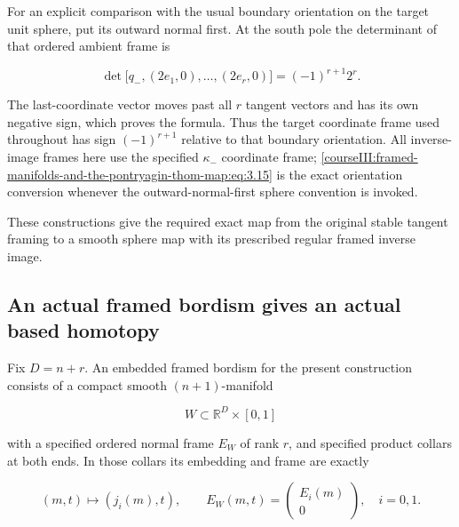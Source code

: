 For an explicit comparison with the usual boundary orientation on the target unit sphere, put its outward normal first. At the south pole the determinant of that ordered ambient frame is

\begin{equation}
\det\bigl[q_-,(2e_1,0),\ldots,(2e_r,0)\bigr]
                       =(-1)^{r+1}2^r.
 \label{courseIII:framed-manifolds-and-the-pontryagin-thom-map:eq:3.15}
\end{equation}

The last-coordinate vector moves past all \(r\) tangent vectors and has its own negative sign, which proves the formula. Thus the target coordinate frame used throughout has sign \((-1)^{r+1}\) relative to that boundary orientation. All inverse-image frames here use the specified \(\kappa_-\) coordinate frame; \eqref{courseIII:framed-manifolds-and-the-pontryagin-thom-map:eq:3.15} is the exact orientation conversion whenever the outward-normal-first sphere convention is invoked.

These constructions give the required exact map from the original stable tangent framing to a smooth sphere map with its prescribed regular framed inverse image.

\label{courseIII:framed-manifolds-and-the-pontryagin-thom-map:pt-bordism-to-homotopy}

\subsection{An actual framed bordism gives an actual based homotopy}
\label{courseIII:framed-manifolds-and-the-pontryagin-thom-map:section-4}

\label{courseIII:pontryagin-thom:4}

Fix \(D=n+r\). An embedded framed bordism for the present construction consists of a compact smooth \((n+1)\)-manifold

\begin{equation}
W\subset\mathbb R^D\times[0,1]
 \label{courseIII:framed-manifolds-and-the-pontryagin-thom-map:eq:4.1}
\end{equation}

with a specified ordered normal frame \(E_W\) of rank \(r\), and specified product collars at both ends. In those collars its embedding and frame are exactly

\begin{equation}
(m,t)\longmapsto(j_i(m),t),\qquad
 E_W(m,t)=\begin{pmatrix}E_i(m)\\0\end{pmatrix},
 \quad i=0,1.
 \label{courseIII:framed-manifolds-and-the-pontryagin-thom-map:eq:4.2}
\end{equation}

